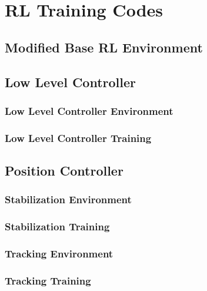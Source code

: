\appendix
{}

\chapter{RL Training Codes}
\section{Modified Base RL Environment}

\clearpage

\section{Low Level Controller}

\subsection{Low Level Controller Environment}

\subsection{Low Level Controller Training}
\clearpage


\section{Position Controller}

\subsection{Stabilization Environment}

\clearpage

\subsection{Stabilization Training}

\clearpage

\subsection{Tracking Environment}

\clearpage

\subsection{Tracking Training}

\clearpage

